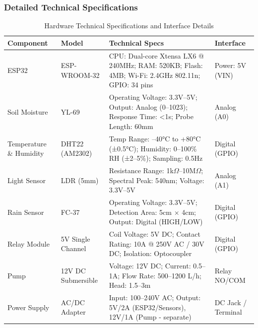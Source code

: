 \endgroup

\FloatBarrier
{}

\subsubsection{Detailed Technical Specifications}

\begin{table}[!htbp]
\centering
\caption{Hardware Technical Specifications and Interface Details}
\label{tab:hardware-technical-specs}
\small
\setlength{\tabcolsep}{5pt}
\begin{tabularx}{\textwidth}{|p{}|p{}|X|p{}|}
\hline
\textbf{Component} & \textbf{Model} & \textbf{Technical Specs} & 
\textbf{Interface} \\
\hline
ESP32 & ESP-WROOM-32 &
CPU: Dual-core Xtensa LX6 @ 240MHz; RAM: 520KB; Flash: 4MB; 
Wi-Fi: 2.4GHz 802.11n; GPIO: 34 pins &
Power: 5V (VIN) \\
\hline
Soil Moisture & YL-69 &
Operating Voltage: 3.3V--5V; Output: Analog (0--1023); Response 
Time: \textless 1s; Probe Length: 60mm &
Analog (A0) \\
\hline
Temperature \& Humidity & DHT22 (AM2302) &
Temp Range: –40°C to +80°C (±0.5°C); Humidity: 0--100\% RH 
(±2--5\%); Sampling: 0.5Hz &
Digital (GPIO) \\
\hline
Light Sensor & LDR (5mm) &
Resistance Range: 1k$\Omega$--10M$\Omega$; Spectral Peak: 540nm; 
Voltage: 3.3V--5V &
Analog (A1) \\
\hline
Rain Sensor & FC-37 &
Operating Voltage: 3.3V--5V; Detection Area: 5cm $\times$ 4cm; 
Output: Digital (HIGH/LOW) &
Digital (GPIO) \\
\hline
Relay Module & 5V Single Channel &
Coil Voltage: 5V DC; Contact Rating: 10A @ 250V AC / 30V DC; 
Isolation: Optocoupler &
Digital (GPIO) \\
\hline
Pump & 12V DC Submersible &
Voltage: 12V DC; Current: 0.5--1A; Flow Rate: 500--1200 L/h; 
Head: 1.5--3m &
Relay NO/COM \\
\hline
Power Supply & AC/DC Adapter &
Input: 100--240V AC; Output: 5V/2A (ESP32/Sensors), 12V/1A 
(Pump - separate) &
DC Jack / Terminal \\
\hline
\end{tabularx}
\end{table}

\FloatBarrier
{}

\newpage

